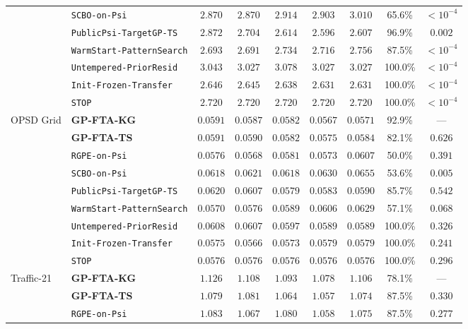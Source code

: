\begin{table}[htbp]
{\begin{tabular}{llccccccc}
 & \texttt{SCBO-on-Psi} & $2.870$ & $2.870$ & $2.914$ & $2.903$ & $3.010$ & 65.6\% & $<10^{-4}$ \\
 & \texttt{PublicPsi-TargetGP-TS} & $2.872$ & $2.704$ & $2.614$ & $2.596$ & $2.607$ & 96.9\% & $0.002$ \\
 & \texttt{WarmStart-PatternSearch} & $2.693$ & $2.691$ & $2.734$ & $2.716$ & $2.756$ & 87.5\% & $<10^{-4}$ \\
 & \texttt{Untempered-PriorResid} & $3.043$ & $3.027$ & $3.078$ & $3.027$ & $3.027$ & 100.0\% & $<10^{-4}$ \\
 & \texttt{Init-Frozen-Transfer} & $2.646$ & $2.645$ & $2.638$ & $2.631$ & $2.631$ & 100.0\% & $<10^{-4}$ \\
 & \texttt{STOP} & $2.720$ & $2.720$ & $2.720$ & $2.720$ & $2.720$ & 100.0\% & $<10^{-4}$ \\
\midrule
\multirow{9}{*}{OPSD Grid} & \textbf{GP-FTA-KG} & $0.0591$ & $0.0587$ & $0.0582$ & $\mathbf{0.0567}$ & $\mathbf{0.0571}$ & 92.9\% & --- \\
 & \textbf{GP-FTA-TS} & $0.0591$ & $0.0590$ & $0.0582$ & $0.0575$ & $0.0584$ & 82.1\% & $0.626$ \\
 & \texttt{RGPE-on-Psi} & $0.0576$ & $0.0568$ & $0.0581$ & $0.0573$ & $0.0607$ & 50.0\% & $0.391$ \\
 & \texttt{SCBO-on-Psi} & $0.0618$ & $0.0621$ & $0.0618$ & $0.0630$ & $0.0655$ & 53.6\% & $0.005$ \\
 & \texttt{PublicPsi-TargetGP-TS} & $0.0620$ & $0.0607$ & $0.0579$ & $0.0583$ & $0.0590$ & 85.7\% & $0.542$ \\
 & \texttt{WarmStart-PatternSearch} & $\mathbf{0.0570}$ & $0.0576$ & $0.0589$ & $0.0606$ & $0.0629$ & 57.1\% & $0.068$ \\
 & \texttt{Untempered-PriorResid} & $0.0608$ & $0.0607$ & $0.0597$ & $0.0589$ & $0.0589$ & 100.0\% & $0.326$ \\
 & \texttt{Init-Frozen-Transfer} & $0.0575$ & $\mathbf{0.0566}$ & $\mathbf{0.0573}$ & $0.0579$ & $0.0579$ & 100.0\% & $0.241$ \\
 & \texttt{STOP} & $0.0576$ & $0.0576$ & $0.0576$ & $0.0576$ & $0.0576$ & 100.0\% & $0.296$ \\
\midrule
\multirow{9}{*}{Traffic-21} & \textbf{GP-FTA-KG} & $1.126$ & $1.108$ & $1.093$ & $1.078$ & $1.106$ & 78.1\% & --- \\
 & \textbf{GP-FTA-TS} & $1.079$ & $1.081$ & $1.064$ & $1.057$ & $1.074$ & 87.5\% & $0.330$ \\
 & \texttt{RGPE-on-Psi} & $1.083$ & $1.067$ & $1.080$ & $1.058$ & $1.075$ & 87.5\% & $0.277$ \\

\end{tabular}}
\end{table}
